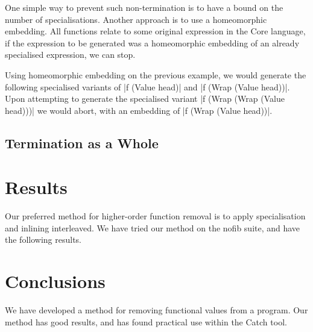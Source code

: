 \documentclass[preprint]{sigplanconf}
\begin{document}
One simple way to prevent such non-termination is to have a bound on the number of specialisations. Another approach is to use a homeomorphic embedding. All functions relate to some original expression in the Core language, if the expression to be generated was a homeomorphic embedding of an already specialised expression, we can stop.

Using homeomorphic embedding on the previous example, we would generate the following specialised variants of |f (Value head)| and |f (Wrap (Value head))|. Upon attempting to generate the specialised variant |f (Wrap (Wrap (Value head)))| we would abort, with an embedding of |f (Wrap (Value head))|.

\subsection{Termination as a Whole}






\section{Results}

Our preferred method for higher-order function removal is to apply specialisation and inlining interleaved. We have tried our method on the nofib suite, and have the following results.

\section{Conclusions}

We have developed a method for removing functional values from a program. Our method has good results, and has found practical use within the Catch tool.





\small

\end{document}
